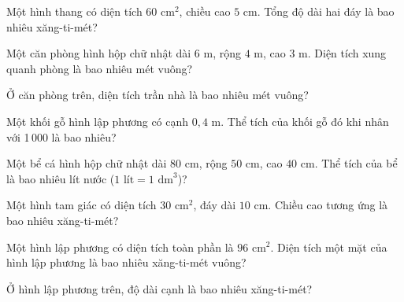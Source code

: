 \begin{ex}
  Một hình thang có diện tích $60\text{ cm}^2$, chiều cao $5\text{ cm}$. Tổng độ dài hai đáy là bao nhiêu xăng-ti-mét?
\end{ex}

\begin{ex}
  Một căn phòng hình hộp chữ nhật dài $6\text{ m}$, rộng $4\text{ m}$, cao $3\text{ m}$. Diện tích xung quanh phòng là bao nhiêu mét vuông?
\end{ex}

\begin{ex}
  Ở căn phòng trên, diện tích trần nhà là bao nhiêu mét vuông?
\end{ex}

\begin{ex}
  Một khối gỗ hình lập phương có cạnh $0{,}4\text{ m}$. Thể tích của khối gỗ đó khi nhân với 1\,000 là bao nhiêu?
\end{ex}

\begin{ex}
  Một bể cá hình hộp chữ nhật dài $80\text{ cm}$, rộng $50\text{ cm}$, cao $40\text{ cm}$. Thể tích của bể là bao nhiêu lít nước ($1\text{ lít} = 1\text{ dm}^3$)?
\end{ex}

\begin{ex}
  Một hình tam giác có diện tích $30\text{ cm}^2$, đáy dài $10\text{ cm}$. Chiều cao tương ứng là bao nhiêu xăng-ti-mét?
\end{ex}

\begin{ex}
  Một hình lập phương có diện tích toàn phần là $96\text{ cm}^2$. Diện tích một mặt của hình lập phương là bao nhiêu xăng-ti-mét vuông?
\end{ex}

\begin{ex}
  Ở hình lập phương trên, độ dài cạnh là bao nhiêu xăng-ti-mét?
\end{ex}

